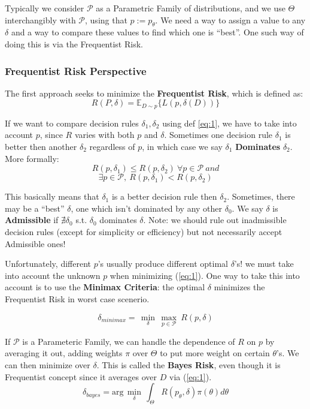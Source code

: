 \documentclass[]{article}
\theoremstyle{mattstyle}
\theoremstyle{definition}
\begin{document}
Typically we consider \(\mathcal{P}\) as a Parametric Family of distributions, and we use \(\Theta\) interchangibly with \(\mathcal{P}\), using that \(p := p_{\theta}\). We need a way to assign a value to any \(\delta\) and a way to compare these values to find which one is ``best''. One such way of doing this is via the Frequentist Risk.

\subsubsection{Frequentist Risk Perspective} 
The first approach seeks to minimize the \textbf{Frequentist Risk}, which is defined as:
\begin{equation}\label{eq:1}
R(P,\delta)=\mathbb{E}_{D\sim p}\{L(p,\delta(D))\}
\end{equation}

If we want to compare decision rules \(\delta_1, \delta_2\) using def \ref{eq:1}, we have to take into account \(p\), since \(R\) varies with both \(p\) and \(\delta\). Sometimes one decision rule \(\delta_1\) is better then another \(\delta_2\) regardless of \(p\), in which case we say \(\delta_1\) \textbf{Dominates} \(\delta_2\).
More formally:
$$R(p,\delta_1)\leq R(p,\delta_2) \ \forall p \in \mathcal{P}\ and$$
$$\exists p \in \mathcal{P},\ R(p,\delta_1) < R(p, \delta_2)$$

This basically means that \(\delta_1\) is a better decision rule then \(\delta_2\). Sometimes, there may be a ``best'' \(\delta\), one which isn't dominated by any other \(\delta_0\). We say \(\delta\) is \textbf{Admissible} if $\nexists \delta_0$ s.t. $\delta_0$ dominates $\delta$. Note: we should rule out inadmissible decision rules (except for simplicity or efficiency) but not necessarily accept Admissible ones!

Unfortunately, different \(p\)'s usually produce different optimal \(\delta\)'s! we must take into account the unknown \(p\) when minimizing (\ref{eq:1}). One way to take this into account is to use the \textbf{Minimax Criteria}: the optimal \(\delta\) minimizes the Frequentist Risk in worst case scenerio.

\begin{equation}\delta_{minimax} = \,\min\limits_{\delta}\,\max\limits_{p \in \mathcal{P}}\ R(p,\delta)
\end{equation}

If \(\mathcal{P}\) is a Parameteric Family, we can handle the dependence of \(R\) on \(p\) by averaging it out, adding weights \(\pi\) over $\Theta$ to put more weight on certain $\theta$'s. We can then minimize over \(\delta\). This is called the \textbf{Bayes Risk}, even though it is Frequentist concept since it averages over $D$ via (\ref{eq:1}).
\begin{equation}\label{eq:3}
\delta_{bayes}= \text{arg}\,\min\limits_{\delta}\,\int_{\Theta}^{}R(p_\theta,\delta)\pi(\theta)d\theta
\end{equation}
\end{document}
